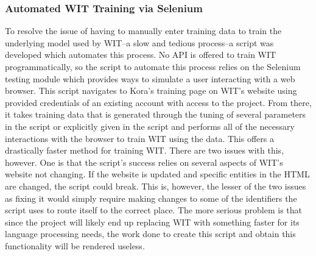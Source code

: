 \documentclass[onecolumn, draftclsnofoot,10pt, compsoc]{IEEEtran}
\begin{document}
    	\subsubsection{Automated WIT Training via Selenium}
		    To resolve the issue of having to manually enter training data to train the underlying model used by WIT--a slow and tedious process--a script was developed which automates this process.
		    No API is offered to train WIT programmatically, so the script to automate this process relies on the Selenium testing module which provides ways to simulate a user interacting with a web browser.
		    This script navigates to Kora’s training page on WIT’s website using provided credentials of an existing account with access to the project.
		    From there, it takes training data that is generated through the tuning of several parameters in the script or explicitly given in the script and performs all of the necessary interactions with the browser to train WIT using the data.
		    This offers a drastically faster method for training WIT.
		    There are two issues with this, however.
		    One is that the script’s success relies on several aspects of WIT’s website not changing.
		    If the website is updated and specific entities in the HTML are changed, the script could break.
		    This is, however, the lesser of the two issues as fixing it would simply require making changes to some of the identifiers the script uses to route itself to the correct place.
		    The more serious problem is that since the project will likely end up replacing WIT with something faster for its language processing needs, the work done to create this script and obtain this functionality will be rendered useless.

 
\end{document}
